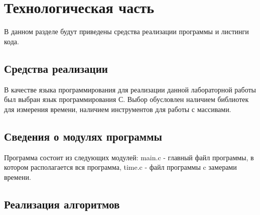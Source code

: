 \chapter{Технологическая часть}

В данном разделе будут приведены средства реализации программы и листинги кода.

\section{Средства реализации}

В качестве языка программирования для реализации данной лабораторной работы был выбран язык программирования С. Выбор обусловлен наличием библиотек для измерения времени, наличием инструментов для работы с массивами.


\section{Сведения о модулях программы}
Программа состоит из следующих модулей:
main.c - главный файл программы, в котором располагается вся программа,
time.c - файл программы c замерами времени.


\section{Реализация алгоритмов}

